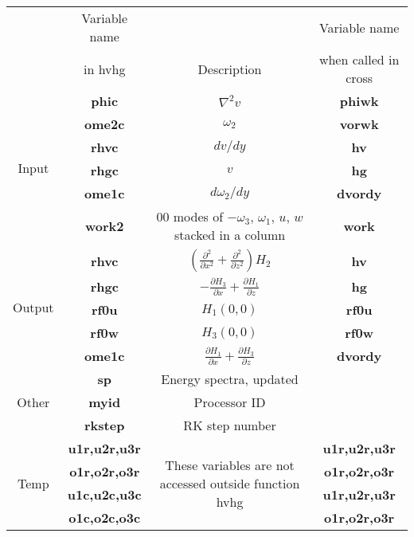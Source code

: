 \documentclass[titlepage,12pt,letter]{article}
\newcommand{\p}{\partial}
\newcommand{\paren}[1]{\left( #1 \right)}
\numberwithin{equation}{section}
\begin{document}
\begin{table}[H]
	\centering 
	\renewcommand{\arraystretch}{1.4} 
	\begin{tabular}{c|c|c|c}
		&Variable name &           &Variable name        \\
		&in hvhg       &Description&when called in cross \\ \hline
		\multirow{6}{*}{Input}&\textbf{phic}&$\nabla^2v$&\textbf{phiwk}\\
		&\textbf{ome2c}&$\omega_2$&\textbf{vorwk}\\
		&\textbf{rhvc}&$dv/dy$&\textbf{hv}\\
		&\textbf{rhgc}&$v$&\textbf{hg}\\
		&\textbf{ome1c}&$d \omega_2/dy$ &\textbf{dvordy}\\ 
		&\textbf{work2}& 00 modes of $-\omega_3$, $\omega_1$, $u$, $w$ stacked in a column&\textbf{work}\\
		
		\hline
		
		\multirow{5}{*}{Output}&\textbf{rhvc}& $\paren{\frac{\p^2}{\p x^2}+\frac{\p^2}{\p z^2}} H_2$&\textbf{hv}\\
		&\textbf{rhgc}&$-\frac{\p H_3}{\p x} + \frac{\p H_1}{\p z}$&\textbf{hg}\\
		&\textbf{rf0u}&$H_1(0,0)$&\textbf{rf0u}\\
		&\textbf{rf0w}&$H_3(0,0)$&\textbf{rf0w}\\
		&\textbf{ome1c}&$\frac{\p H_1}{\p x} + \frac{\p H_3}{\p z}$&\textbf{dvordy}\\
		
		\hline
		
		\multirow{3}{*}{Other}&\textbf{sp}&Energy spectra, updated&\\
		&\textbf{myid}&Processor ID&\\
		&\textbf{rkstep}&RK step number&\\
		
		\hline
		
		\multirow{4}{*}{Temp}&\textbf{u1r,u2r,u3r}&\multirow{4}{6cm}{These variables are not accessed outside function hvhg}&\textbf{u1r,u2r,u3r}\\
		&\textbf{o1r,o2r,o3r}&&\textbf{o1r,o2r,o3r}\\
		&\textbf{u1c,u2c,u3c}&&\textbf{u1r,u2r,u3r}\\
		&\textbf{o1c,o2c,o3c}&&\textbf{o1r,o2r,o3r}\\
		
		\hline
		
	\end{tabular} 
\end{table} 
\end{document}
